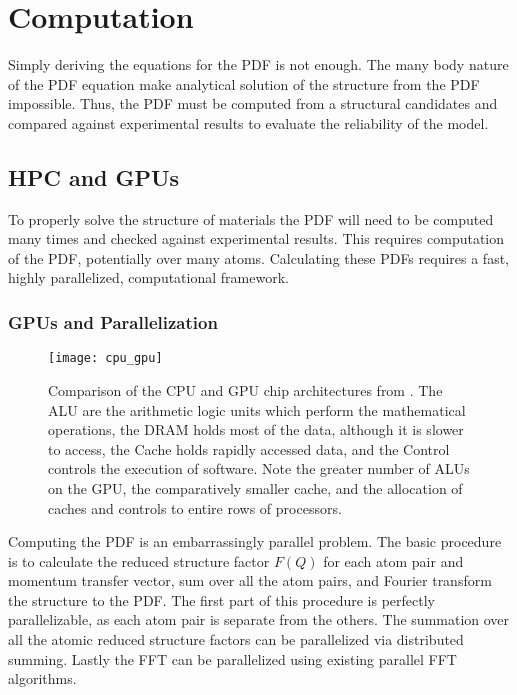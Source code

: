 \section{Computation} \label{sec:comp}
Simply deriving the equations for the PDF is not enough.
The many body nature of the PDF equation make analytical solution of the structure from the PDF impossible.
Thus, the PDF must be computed from a structural candidates and compared against experimental results to evaluate the reliability of the model.

\subsection{HPC and GPUs}
To properly solve the structure of materials the PDF will need to be computed many times and checked against experimental results.
This requires computation of the PDF, potentially over many atoms.
Calculating these PDFs requires a fast, highly parallelized, computational framework.
\subsubsection{GPUs and Parallelization}
\begin{figure}
    \texttt{[image: cpu\_gpu]}
    \caption[Comparison of the CPU and GPU chip architectures]{
    Comparison of the CPU and GPU chip architectures from \cite{Chen2013}.
    The ALU are the arithmetic logic units which perform the mathematical operations,
    the DRAM holds most of the data, although it is slower to access,
    the Cache holds rapidly accessed data,
    and the Control controls the execution of software.
    Note the greater number of ALUs on the GPU, the comparatively smaller cache,
    and the allocation of caches and controls to entire rows of processors.}
    \label{fig:cpu_vs_gpu}
\end{figure}
Computing the PDF is an embarrassingly parallel problem.
The basic procedure is to calculate the reduced structure factor $F(Q)$ for each atom pair and momentum transfer vector, sum over all the atom pairs, and Fourier transform the structure to the PDF.
The first part of this procedure is perfectly parallelizable, as each atom pair is separate from the others.
The summation over all the atomic reduced structure factors can be parallelized via distributed summing.
Lastly the FFT can be parallelized using existing parallel FFT algorithms.

